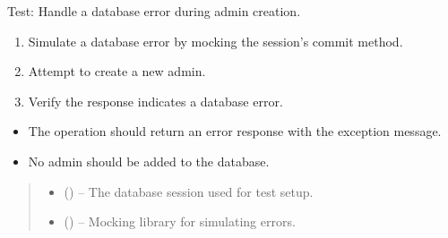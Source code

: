 \documentclass[letterpaper,10pt,english]{sphinxmanual}
\begin{document}
\begin{fulllineitems}
\label{\detokenize{test:test.test_admin.test_create_admin_database_error}}
\pysigstartsignatures
\pysiglinewithargsret
{}
{\sphinxparamcomma {}}
{}
\pysigstopsignatures
\sphinxAtStartPar
Test: Handle a database error during admin creation.
\begin{description}
\begin{enumerate}
%
\item {} 
\sphinxAtStartPar
Simulate a database error by mocking the session’s commit method.

\item {} 
\sphinxAtStartPar
Attempt to create a new admin.

\item {} 
\sphinxAtStartPar
Verify the response indicates a database error.

\end{enumerate}

\begin{itemize}
\item {} 
\sphinxAtStartPar
The operation should return an error response with the exception message.

\item {} 
\sphinxAtStartPar
No admin should be added to the database.

\end{itemize}

\end{description}
\begin{quote}\begin{description}
\begin{itemize}
\item {} 
\sphinxAtStartPar
{} () – The database session used for test setup.

\item {} 
\sphinxAtStartPar
{} () – Mocking library for simulating errors.

\end{itemize}

\end{description}\end{quote}

\end{fulllineitems}
\end{document}
